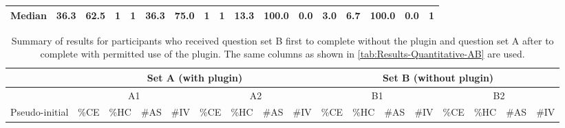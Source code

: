 \begin{landscape}
\begin{table}
\begin{tabular}{@{}ccccccccccccccccc@{}}
      \multicolumn{1}{l|}{Median}         & 36.3      & 62.5      & 1    & \multicolumn{1}{c|}{1}    & 36.3                     & 75.0                     & 1                        & \multicolumn{1}{c|}{1}    & 13.3      & 100.0                    & 0.0                      & \multicolumn{1}{c|}{3.0}  & 6.7                      & 100.0                    & 0.0                      & 1                        \\ \bottomrule
    \end{tabular}
    \label{tab:Results-Quantitative-AB}
  \end{table}
\end{landscape}

\begin{landscape}
  \begin{table}
    \footnotesize
    \caption{
      Summary of results for participants who received question set B first to complete without the plugin and question set A after to complete with permitted use of the plugin.
      The same columns as shown in \autoref{tab:Results-Quantitative-AB} are used.
    }
    \centering
    \begin{tabular}{@{}ccccccccccccccccc@{}}
      \toprule
      \multicolumn{1}{l}{}                & \multicolumn{8}{c}{Set A (with plugin)}                                                                                                                              & \multicolumn{8}{c}{Set B (without plugin)}                                                                                                                                                              \\ \midrule
      \multicolumn{1}{c|}{}               & \multicolumn{4}{c|}{A1}                                 & \multicolumn{4}{c|}{A2}                                                                                    & \multicolumn{4}{c|}{B1}                                                                     & \multicolumn{4}{c}{B2}                                                                                    \\ \midrule
      \multicolumn{1}{c|}{Pseudo-initial} & \%CE     & \%HC      & \#AS & \multicolumn{1}{l|}{\#IV} & \multicolumn{1}{l}{\%CE} & \multicolumn{1}{l}{\%HC} & \multicolumn{1}{l}{\#AS} & \multicolumn{1}{l|}{\#IV} & \%CE      & \multicolumn{1}{l}{\%HC} & \multicolumn{1}{l}{\#AS} & \multicolumn{1}{l|}{\#IV} & \multicolumn{1}{l}{\%CE} & \multicolumn{1}{l}{\%HC} & \multicolumn{1}{l}{\#AS} & \multicolumn{1}{l}{\#IV} \\ \midrule

\end{tabular}
\end{table}
\end{landscape}
